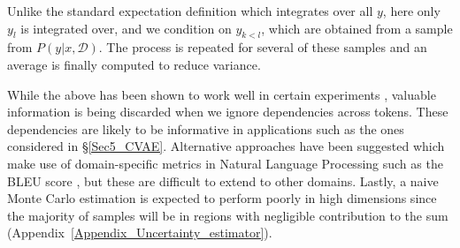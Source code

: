 Unlike the standard expectation definition which integrates over all $y$, here only $y_l$ is integrated over, and we condition on $y_{k<l}$, which are obtained from a sample from $P(y|x,\mathcal{D})$. The process is repeated for several of these samples and an average is finally computed to reduce variance.

While the above has been shown to work well in certain experiments \citep{malinin2020uncertainty}, valuable information is being discarded when we ignore dependencies across tokens. These dependencies are likely to be informative in applications such as the ones considered in \S\ref{Sec5_CVAE}. Alternative approaches have been suggested which make use of domain-specific metrics in Natural Language Processing such as the BLEU score \citep{Xiao2019Wat}, but these are difficult to extend to other domains. Lastly, a naive Monte Carlo estimation is expected to perform poorly in high dimensions since the majority of samples will be in regions with negligible contribution to the sum (Appendix~\ref{Appendix_Uncertainty_estimator}).